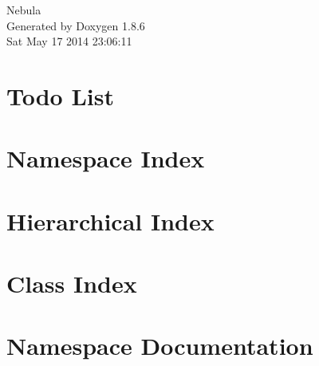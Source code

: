 \documentclass[twoside]{book}
\newcommand{\clearemptydoublepage}{%
  \newpage{\pagestyle{empty}\cleardoublepage}%
}
\begin{document}
\hypersetup{pageanchor=false}
\begin{titlepage}
\vspace*{7cm}
\begin{center}%
{\Large Nebula }\\
\vspace*{1cm}
{\large Generated by Doxygen 1.8.6}\\
\vspace*{0.5cm}
{\small Sat May 17 2014 23:06:11}\\
\end{center}
\end{titlepage}
\clearemptydoublepage
\tableofcontents
\clearemptydoublepage
{}
\hypersetup{pageanchor=true}

\chapter{Todo List}
\label{todo}
\hypertarget{todo}{}

\chapter{Namespace Index}

\chapter{Hierarchical Index}

\chapter{Class Index}

\chapter{Namespace Documentation}























\end{document}
